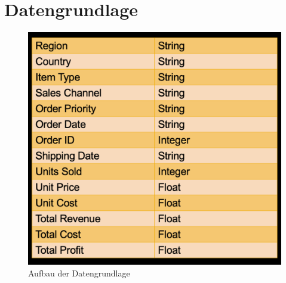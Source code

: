 \chapter{Datengrundlage}
\begin{figure}[ht]
	\centering
	\includegraphics[width=1\textwidth]{Bilder/Daten.png} 
	\caption{Aufbau der Datengrundlage}
	\label{fig:Daten}
\end{figure}
